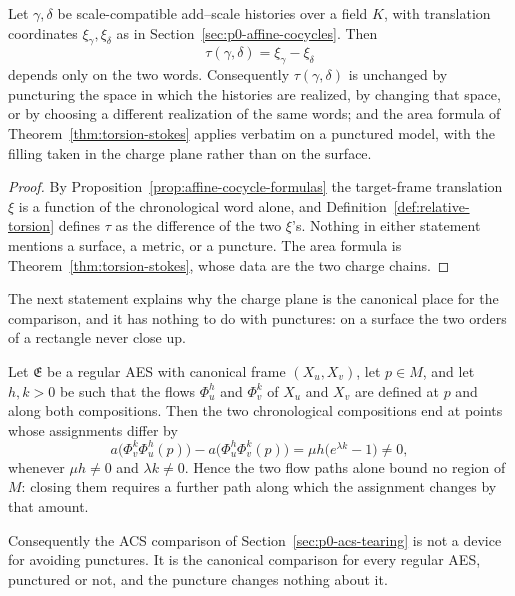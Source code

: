 \begin{proposition}
\label{prop:p0-tearing-puncture-independent}
Let $\gamma,\delta$ be scale-compatible add--scale histories over a field $K$,
with translation coordinates $\xi_\gamma,\xi_\delta$ as in
Section~\ref{sec:p0-affine-cocycles}.  Then
\[
  \tau(\gamma,\delta)=\xi_\gamma-\xi_\delta
\]
depends only on the two words.  Consequently $\tau(\gamma,\delta)$ is unchanged
by puncturing the space in which the histories are realized, by changing that
space, or by choosing a different realization of the same words; and the area
formula of Theorem~\ref{thm:torsion-stokes} applies verbatim on a punctured
model, with the filling taken in the charge plane rather than on the surface.
\end{proposition}

\begin{proof}
By Proposition~\ref{prop:affine-cocycle-formulas} the target-frame translation
$\xi$ is a function of the chronological word alone, and
Definition~\ref{def:relative-torsion} defines $\tau$ as the difference of the two
$\xi$'s.  Nothing in either statement mentions a surface, a metric, or a puncture.
The area formula is Theorem~\ref{thm:torsion-stokes}, whose data are the two
charge chains.
\end{proof}

The next statement explains why the charge plane is the canonical place for the
comparison, and it has nothing to do with punctures: on a surface the two orders
of a rectangle never close up.

\begin{proposition}
\label{prop:p0-surface-does-not-close}
Let $\mathfrak E$ be a regular AES with canonical frame $(X_u,X_v)$, let
$p\in M$, and let $h,k>0$ be such that the flows $\Phi_u^h$ and $\Phi_v^k$ of
$X_u$ and $X_v$ are defined at $p$ and along both compositions.  Then the two
chronological compositions end at points whose assignments differ by
\begin{equation}\label{eq:p0-surface-comparison-defect}
  a\bigl(\Phi_v^k\Phi_u^h(p)\bigr)-a\bigl(\Phi_u^h\Phi_v^k(p)\bigr)
  =\mu h\bigl(e^{\lambda k}-1\bigr)\ne0 ,
\end{equation}
whenever $\mu h\ne0$ and $\lambda k\ne0$.  Hence the two flow paths alone bound
no region of $M$: closing them requires a further path along which the
assignment changes by that amount.

Consequently the ACS comparison of Section~\ref{sec:p0-acs-tearing} is not a
device for avoiding punctures.  It is the canonical comparison for every regular
AES, punctured or not, and the puncture changes nothing about it.
\end{proposition}

